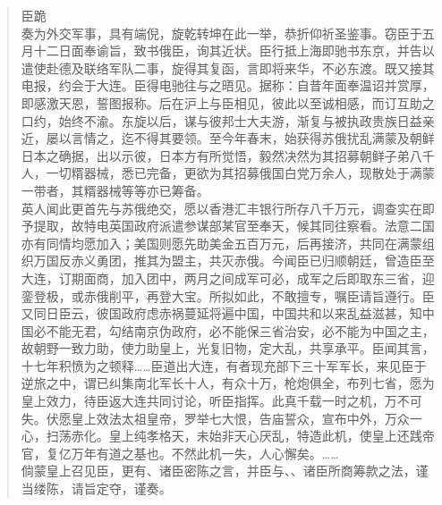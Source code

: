 \begin{quote}
	臣跪\\

奏为外交军事，具有端倪，旋乾转坤在此一举，恭折仰祈圣鉴事。窃臣于五月十二日面奉谕旨，致书俄臣，询其近状。臣行抵上海即驰书东京，并告以遣使赴德及联络军队二事，旋得其复函，言即将来华，不必东渡。既又接其电报，约会于大连。臣得电驰往与之晤见。据称：自昔年面奉温诏并赏厚，即感激天恩，誓图报称。后在沪上与臣相见，彼此以至诚相感，而订互助之口约，始终不渝。东旋以后，谋与彼邦士大夫游，渐复与被执政贵族日益亲近，屡以言情之，迄不得其要领。至今年春末，始获得苏俄扰乱满蒙及朝鲜日本之确据，出以示彼，日本方有所觉悟，毅然决然为其招募朝鲜子弟八千人，一切糈器械，悉已完备，更欲为其招募俄国白党万余人，现散处于满蒙一带者，其糈器械等等亦已筹备。\\

英人闻此更首先与苏俄绝交，愿以香港汇丰银行所存八千万元，调查实在即予提取，故特电英国政府派遣参谋部某官至奉天，候其同往察看。法意二国亦有同情均愿加入；美国则愿先助美金五百万元，后再接济，共同在满蒙组织万国反赤义勇团，推其为盟主，共灭赤俄。今闻臣已归顺朝廷，曾造臣至大连，订期面商，加入团中，两月之间成军可必，成军之后即取东三省，迎銮登极，或赤俄削平，再登大宝。所拟如此，不敢擅专，嘱臣请旨遵行。臣又同日臣云，彼国政府虑赤祸蔓延将遍中国，中国共和以来乱益滋甚，知中国必不能无君，勾结南京伪政府，必不能保三省治安，必不能为中国之主，故朝野一致力助，使力助皇上，光复旧物，定大乱，共享承平。臣闻其言，十七年积愤为之顿释……臣道出大连，有者现充部下三十军军长，来见臣于逆旅之中，谓已纠集南北军长十人，有众十万，枪炮俱全，布列七省，愿为皇上效力，待臣返大连共同讨论，听臣指挥。此真千载一时之机，万不可失。伏愿皇上效法太祖皇帝，罗举七大恨，告庙誓众，宣布中外，万众一心，扫荡赤化。皇上纯孝格天，未始非天心厌乱，特造此机，使皇上还践帝官，复亿万年有道之基也。不然此机一失，人心懈矣。……\\

倘蒙皇上召见臣，更有、诸臣密陈之言，并臣与、、诸臣所商筹款之法，谨当缕陈，请旨定夺，谨奏。\\


\end{quote}
